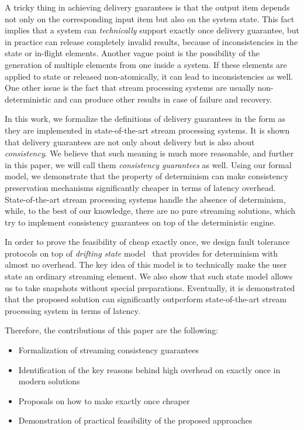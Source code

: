 A tricky thing in achieving delivery guarantees is that the output item depends not only on the corresponding input item but also on the system state. This fact implies that a system can {\em technically} support exactly once delivery guarantee, but in practice can release completely invalid results, because of inconsistencies in the state or in-flight elements. Another vague point is the possibility of the generation of multiple elements from one inside a system. If these elements are applied to state or released non-atomically, it can lead to inconsistencies as well. One other issue is the fact that stream processing systems are usually non-deterministic and can produce other results in case of failure and recovery. 

In this work, we formalize the definitions of delivery guarantees in the form as they are implemented in state-of-the-art stream processing systems. It is shown that delivery guarantees are not only about delivery but is also about {\em consistency}. We believe that such meaning is much more reasonable, and further in this paper, we will call them {\em consistency guarantees} as well. Using our formal model, we demonstrate that the property of determinism can make consistency preservation mechanisms significantly cheaper in terms of latency overhead. State-of-the-art stream processing systems handle the absence of determinism, while, to the best of our knowledge, there are no pure streaming solutions, which try to implement consistency guarantees on top of the deterministic engine.

In order to prove the feasibility of cheap exactly once, we design fault tolerance protocols on top of {\em drifting state} model~\cite{we2018adbis} that provides for determinism with almost no overhead. The key idea of this model is to technically make the user state an ordinary streaming element. We also show that such state model allows us to take snapshots without special preparations. Eventually, it is demonstrated that the proposed solution can significantly outperform state-of-the-art stream processing system in terms of latency.

Therefore, the contributions of this paper are the following: 
\begin{itemize}
    \item Formalization of streaming consistency guarantees 
    \item Identification of the key reasons behind high overhead on exactly once in modern solutions 
    \item Proposals on how to make exactly once cheaper
    \item Demonstration of practical feasibility of the proposed approaches
\end{itemize}

